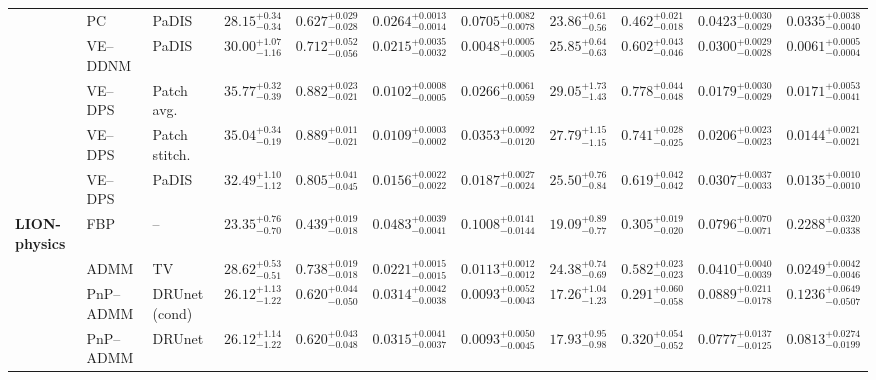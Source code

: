 \begin{landscape}
\begin{table}[p]
{\begin{tabular}{lllcccccccc}
 & PC & PaDIS & $28.15^{+0.34}_{-0.34}$ & $0.627^{+0.029}_{-0.028}$ & $0.0264^{+0.0013}_{-0.0014}$ & $0.0705^{+0.0082}_{-0.0078}$ & $23.86^{+0.61}_{-0.56}$ & $0.462^{+0.021}_{-0.018}$ & $0.0423^{+0.0030}_{-0.0029}$ & $0.0335^{+0.0038}_{-0.0040}$ \\
 & VE--DDNM & PaDIS & $30.00^{+1.07}_{-1.16}$ & $0.712^{+0.052}_{-0.056}$ & $0.0215^{+0.0035}_{-0.0032}$ & $0.0048^{+0.0005}_{-0.0005}$ & $25.85^{+0.64}_{-0.63}$ & $0.602^{+0.043}_{-0.046}$ & $0.0300^{+0.0029}_{-0.0028}$ & $0.0061^{+0.0005}_{-0.0004}$ \\
 & VE--DPS & Patch avg. & $35.77^{+0.32}_{-0.39}$ & $0.882^{+0.023}_{-0.021}$ & $0.0102^{+0.0008}_{-0.0005}$ & $0.0266^{+0.0061}_{-0.0059}$ & $29.05^{+1.73}_{-1.43}$ & $0.778^{+0.044}_{-0.048}$ & $0.0179^{+0.0030}_{-0.0029}$ & $0.0171^{+0.0053}_{-0.0041}$ \\
 & VE--DPS & Patch stitch. & $35.04^{+0.34}_{-0.19}$ & $0.889^{+0.011}_{-0.021}$ & $0.0109^{+0.0003}_{-0.0002}$ & $0.0353^{+0.0092}_{-0.0120}$ & $27.79^{+1.15}_{-1.15}$ & $0.741^{+0.028}_{-0.025}$ & $0.0206^{+0.0023}_{-0.0023}$ & $0.0144^{+0.0021}_{-0.0021}$ \\
 & VE--DPS & PaDIS & $32.49^{+1.10}_{-1.12}$ & $0.805^{+0.041}_{-0.045}$ & $0.0156^{+0.0022}_{-0.0022}$ & $0.0187^{+0.0027}_{-0.0024}$ & $25.50^{+0.76}_{-0.84}$ & $0.619^{+0.042}_{-0.042}$ & $0.0307^{+0.0037}_{-0.0033}$ & $0.0135^{+0.0010}_{-0.0010}$ \\
\addlinespace[2pt]\midrule
\textbf{LION-physics} & FBP & -- & $23.35^{+0.76}_{-0.70}$ & $0.439^{+0.019}_{-0.018}$ & $0.0483^{+0.0039}_{-0.0041}$ & $0.1008^{+0.0141}_{-0.0144}$ & $19.09^{+0.89}_{-0.77}$ & $0.305^{+0.019}_{-0.020}$ & $0.0796^{+0.0070}_{-0.0071}$ & $0.2288^{+0.0320}_{-0.0338}$ \\
 & ADMM & TV & $28.62^{+0.53}_{-0.51}$ & $0.738^{+0.019}_{-0.018}$ & $0.0221^{+0.0015}_{-0.0015}$ & $0.0113^{+0.0012}_{-0.0012}$ & $24.38^{+0.74}_{-0.69}$ & $0.582^{+0.023}_{-0.023}$ & $0.0410^{+0.0040}_{-0.0039}$ & $0.0249^{+0.0042}_{-0.0046}$ \\
 & PnP--ADMM & DRUnet (cond) & $26.12^{+1.13}_{-1.22}$ & $0.620^{+0.044}_{-0.050}$ & $0.0314^{+0.0042}_{-0.0038}$ & $0.0093^{+0.0052}_{-0.0043}$ & $17.26^{+1.04}_{-1.23}$ & $0.291^{+0.060}_{-0.058}$ & $0.0889^{+0.0211}_{-0.0178}$ & $0.1236^{+0.0649}_{-0.0507}$ \\
 & PnP--ADMM & DRUnet & $26.12^{+1.14}_{-1.22}$ & $0.620^{+0.043}_{-0.048}$ & $0.0315^{+0.0041}_{-0.0037}$ & $0.0093^{+0.0050}_{-0.0045}$ & $17.93^{+0.95}_{-0.98}$ & $0.320^{+0.054}_{-0.052}$ & $0.0777^{+0.0137}_{-0.0125}$ & $0.0813^{+0.0274}_{-0.0199}$ \\

\end{tabular}}
\end{table}
\end{landscape}
